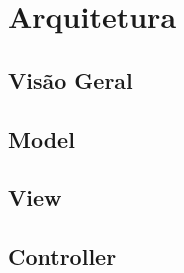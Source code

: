 \section{Arquitetura}

\subsection{Visão Geral}

\subsection{Model}

\subsection{View}

\subsection{Controller}
